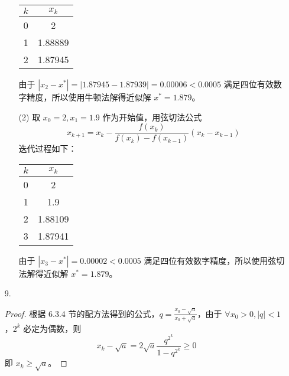 \documentclass{sjtuarticle}
\begin{document}
\begin{itemize}
\begin{solution}
\begin{itemize}
            \begin{table}[H]
                \centering
                \begin{tabular}{cc}
                    \hline
                    $k$ & $x_k$ \\
                    \hline
                    0 & 2 \\
                    1 & 1.88889 \\
                    2 & 1.87945 \\
                    \hline
                \end{tabular}
            \end{table}

            由于 $|x_2-x^*|=|1.87945-1.87939|=0.00006<0.0005$ 满足四位有效数字精度，所以使用牛顿法解得近似解 $x^*=1.879$。
            \item[(2)] 取 $x_0=2, x_1=1.9$ 作为开始值，用弦切法公式
            \begin{equation*}
                x_{k+1}=x_k-\frac{f(x_k)}{f(x_k)-f(x_{k-1})}(x_k-x_{k-1})
            \end{equation*}
            迭代过程如下：
            
            \begin{table}[H]
                \centering
                \begin{tabular}{cc}
                    \hline
                    $k$ & $x_k$ \\
                    \hline
                    0 & 2 \\
                    1 & 1.9 \\
                    2 & 1.88109 \\
                    3 & 1.87941 \\
                    \hline
                \end{tabular}
            \end{table}

            由于 $|x_3-x^*|=0.00002<0.0005$ 满足四位有效数字精度，所以使用弦切法解得近似解 $x^*=1.879$。
        \end{itemize}
    \end{solution}
    \item[9.] \begin{proof}
        根据 6.3.4 节的配方法得到的公式，$q=\frac{x_0-\sqrt{a}}{x_0+\sqrt{a}}$，由于 $\forall x_0>0, |q|<1$，$2^k$ 必定为偶数，则
        \begin{equation*}
            x_k-\sqrt{a}=2\sqrt{a}\frac{q^{2^k}}{1-q^{2^k}}\geq 0
        \end{equation*}
        即 $x_k\geq \sqrt{a}$。
        

\end{proof}
\end{itemize}
\end{document}
